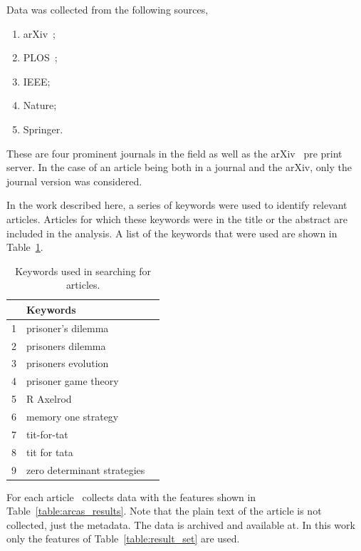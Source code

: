 \documentclass{article}
\begin{document}
Data was collected from the following sources,

\begin{enumerate}
        \item arXiv~\cite{mckiernan2000};
        \item PLOS~\cite{plos_one};
        \item IEEE;
        \item Nature;
        \item Springer.
\end{enumerate}

These are four prominent journals in the field as well as the arXiv~\cite{mckiernan2000}
pre print server. In the case of an article being both in a journal and the arXiv,
only the journal version was considered.

In the work described here, a series of keywords were used to identify relevant
articles. Articles for which these keywords were in the title or the abstract
are included in the analysis. A list of the keywords that were used are
shown in Table~\ref{table:search_keywords}.

\begin{table}[!hbtp]
    \begin{center}
        \begin{tabular}{lll}
            \toprule
             & Keywords & \\
            \midrule
             1 &  prisoner's dilemma & \\
             2 &  prisoners dilemma  & \\
             3 &  prisoners evolution & \\
             4 &  prisoner game theory & \\
             5 &  R Axelrod & \\
             6 &  memory one strategy & \\
             7 &  tit-for-tat & \\
             8 &  tit for tata & \\
             9 &  zero determinant strategies & \\
            \bottomrule
        \end{tabular}
    \end{center}
    \caption{Keywords used in searching for articles.}
    \label{table:search_keywords}
\end{table}

For each article~\cite{} collects data with the features shown in Table~\ref{table:arcas_results}.
Note that the plain text of the article is not collected, just the metadata. The
data is archived and available at. %
In this work only the features of Table~\ref{table:result_set} are used.
\end{document}
